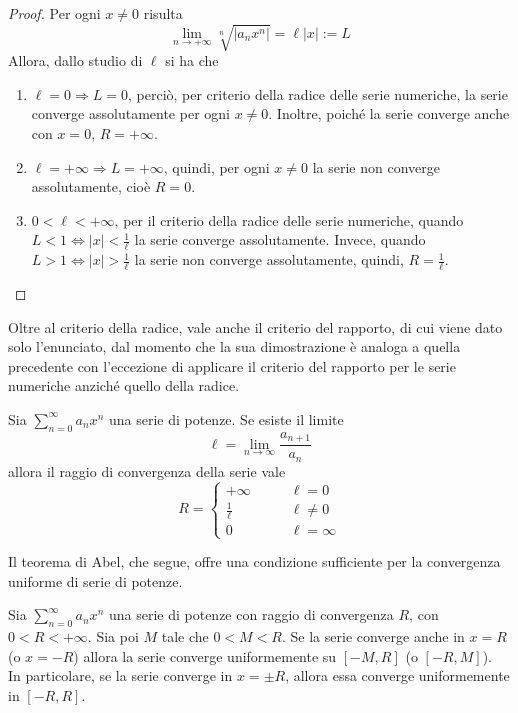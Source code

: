 \begin{proof}
    Per ogni $x \neq 0$ risulta
    \begin{equation}
        \lim_{n \to +\infty}{\sqrt[n]{|a_n x^n|}} = \ell|x| := L
    \end{equation}
    Allora, dallo studio di $\ell$ si ha che
    \begin{enumerate}
        \item $\ell=0 \Rightarrow L=0$, perciò, per criterio della radice delle serie numeriche, la serie converge assolutamente per ogni $x \neq 0$. Inoltre, poiché la serie converge anche con $x=0$, $R=+\infty$.
        \item $\ell= +\infty \Rightarrow L =+ \infty$, quindi, per ogni $x \neq 0$ la serie non converge assolutamente, cioè $R=0$.
        \item $0< \ell<+\infty$, per il criterio della radice delle serie numeriche, quando $L<1 \iff |x|< \tfrac{1}{\ell}$ la serie converge assolutamente. Invece, quando $L>1 \iff |x|>\tfrac{1}{\ell}$ la serie non converge assolutamente, quindi, $R= \tfrac{1}{\ell}$.
    \end{enumerate}
\end{proof}
Oltre al criterio della radice, vale anche il criterio del rapporto, di cui viene dato solo l'enunciato, dal momento che la sua dimostrazione è analoga a quella precedente con l'eccezione di applicare il criterio del rapporto per le serie numeriche anziché quello della radice.
\begin{theorem}
    Sia $\sum\limits_{n=0}^{\infty}{a_n x^n}$ una serie di potenze. Se esiste il limite
    \begin{equation}
        \ell= \lim_{n \to \infty}{\frac{a_{n+1}}{a_n}}
    \end{equation}
    allora il raggio di convergenza della serie vale
    \begin{equation}
        R= \begin{cases}
        +\infty &\qquad \ell=0\\
        \frac{1}{\ell} &\qquad \ell \neq 0\\
        0 &\qquad \ell = \infty
        \end{cases}
    \end{equation}
\end{theorem}
Il teorema di Abel, che segue, offre una condizione sufficiente per la convergenza uniforme di serie di potenze.
\begin{theorem} \label{Teo: Teorema di Abel}
    Sia $\sum\limits_{n=0}^{\infty}{a_n x^n}$ una serie di potenze con raggio di convergenza $R$, con $0<R<+\infty$. Sia poi $M$ tale che $0<M<R$. Se la serie converge anche in $x=R$ (o $x=-R$) allora la serie converge uniformemente su $[-M, R]$ (o $[-R, M]$). \\
    In particolare, se la serie converge in $x= \pm R$, allora essa converge uniformemente in $[-R, R]$.
\end{theorem}
